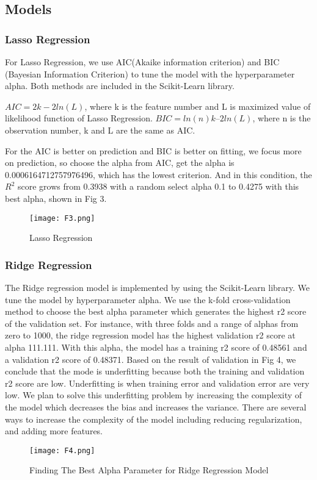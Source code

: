 \documentclass[conference]{IEEEtran}
\begin{document}
\subsection{Models}
\subsubsection{Lasso Regression}
For Lasso Regression, we use AIC(Akaike information criterion) and BIC (Bayesian Information Criterion) to tune the model with the hyperparameter alpha. Both methods are included in the Scikit-Learn library. \par
\(AIC=2k−2ln(L)\), where k is the feature number and L is maximized value of likelihood function of Lasso Regression. \(BIC=ln(n)k–2ln(L)\), where n is the observation number, k and L are the same as AIC.\par
For the AIC is better on prediction and BIC is better on fitting, we focus more on prediction, so choose the alpha from AIC, get the alpha is 0.0006164712757976496, which has the lowest criterion. And in this condition, the \(R^2\) score grows from  0.3938 with a random select alpha 0.1 to 0.4275 with this best alpha, shown in Fig 3.
\begin{figure}[ht]
\begin{center}
\centerline{\texttt{[image: F3.png]}}
\caption{Lasso Regression}
\label{bayespic}
\end{center}
\end{figure}



\subsubsection{Ridge Regression}
The Ridge regression model is implemented by using the Scikit-Learn library. We tune the model by hyperparameter alpha. We use the k-fold cross-validation method to choose the best alpha parameter which generates the highest r2 score of the validation set. For instance, with three folds and a range of alphas from zero to 1000, the ridge regression model has the highest validation r2 score at alpha 111.111. With this alpha, the model has a training r2 score of 0.48561 and a validation r2 score of 0.48371. Based on the result of validation in Fig 4, we conclude that the mode is underfitting because both the training and validation r2 score are low. Underfitting is when training error and validation error are very low. We plan to solve this underfitting problem by increasing the complexity of the model which decreases the bias and increases the variance. There are several ways to increase the complexity of the model including reducing regularization, and adding more features.
\begin{figure}[ht]
\begin{center}
\centerline{\texttt{[image: F4.png]}}
\caption{Finding The Best Alpha Parameter for Ridge Regression Model}
\label{bayespic}
\end{center}
\end{figure}
\end{document}
